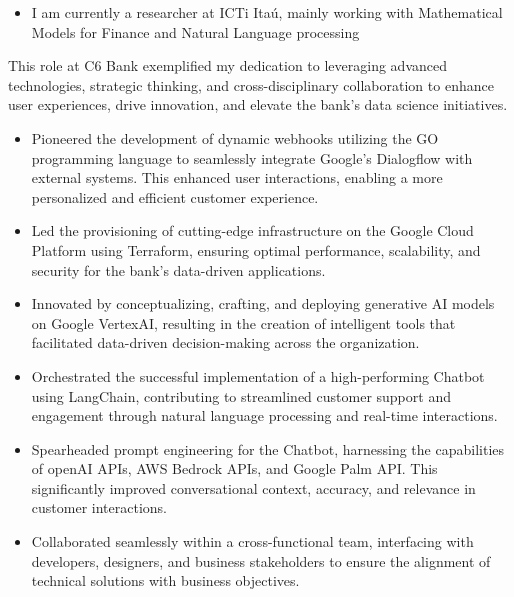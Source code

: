 \documentclass[10pt,a4paper,ragged2e,withhyper,academicons]{altacv}
\begin{document}
\begin{paracol}{1}

\begin{itemize}
    \item I am currently a researcher at ICTi Itaú, mainly working with Mathematical Models for Finance and Natural Language processing
\end{itemize}

\divider
{}
This role at C6 Bank exemplified my dedication to leveraging advanced technologies, strategic thinking, and cross-disciplinary collaboration to enhance user experiences, drive innovation, and elevate the bank's data science initiatives.
\begin{itemize}
    \item Pioneered the development of dynamic webhooks utilizing the GO programming language to seamlessly integrate Google's Dialogflow with external systems. This enhanced user interactions, enabling a more personalized and efficient customer experience.
    \item Led the provisioning of cutting-edge infrastructure on the Google Cloud Platform using Terraform, ensuring optimal performance, scalability, and security for the bank's data-driven applications.
    \item Innovated by conceptualizing, crafting, and deploying generative AI models on Google VertexAI, resulting in the creation of intelligent tools that facilitated data-driven decision-making across the organization.
    \item Orchestrated the successful implementation of a high-performing Chatbot using LangChain, contributing to streamlined customer support and engagement through natural language processing and real-time interactions.
    \item Spearheaded prompt engineering for the Chatbot, harnessing the capabilities of openAI APIs, AWS Bedrock APIs, and Google Palm API. This significantly improved conversational context, accuracy, and relevance in customer interactions.
    \item Collaborated seamlessly within a cross-functional team, interfacing with developers, designers, and business stakeholders to ensure the alignment of technical solutions with business objectives.
    

\end{itemize}
\end{paracol}
\end{document}
